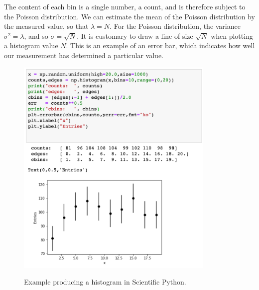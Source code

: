 \documentclass[12pt,oneside]{book}
\begin{document}
The content of each bin is a single number, a count, and is therefore subject to the Poisson distribution.
We can estimate the mean of the Poisson distribution by the measured value, so that $\lambda = N$.
For the Poisson distribution, the variance $\sigma^2 = \lambda$, and so $\sigma = \sqrt{N}$.  It is customary to draw a line of size $\sqrt{N}$ when plotting a histogram value $N$. This is an example of an error bar, which indicates how well our measurement has determined a particular value.

\begin{figure}[htbp]
\begin{center}
{\includegraphics[width=0.85\textwidth]{figs/makehisteg.png}} 
\end{center}
\caption{\label{fig:makehisteg} Example producing a histogram in Scientific Python.}
\end{figure}
\end{document}
